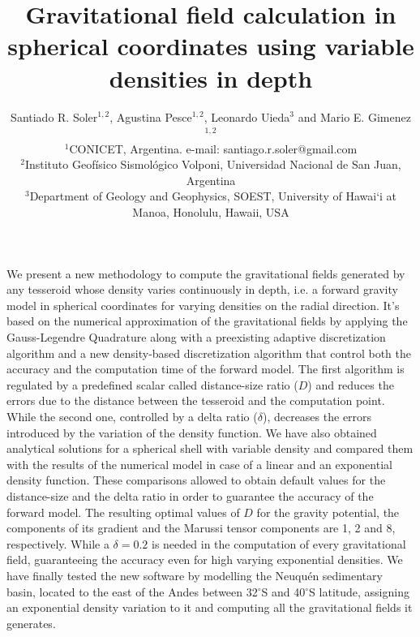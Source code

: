 \documentclass[extra]{gji}
\begin{document}
\title[Variable Density Tesseroids]{
    Gravitational field calculation in spherical coordinates using variable 
    densities in depth
}
\author[S.R. Soler, A. Pesce, L. Uieda and M.E. Gimenez]{
    Santiado R. Soler$^{1,2}$, Agustina Pesce$^{1,2}$, Leonardo Uieda$^3$ and
    Mario E. Gimenez$^{1,2}$ \\
    $^1$CONICET, Argentina. e-mail: santiago.r.soler@gmail.com\\
    $^2$Instituto Geofísico Sismológico Volponi, Universidad Nacional de
    San Juan, Argentina\\
    $^3$Department of Geology and Geophysics, SOEST, University of Hawai‘i at
    Manoa, Honolulu, Hawaii, USA
    }


\maketitle

\begin{summary}
We present a new methodology to compute the gravitational fields generated by 
any tesseroid whose density varies continuously in depth, i.e. a forward 
gravity model in spherical coordinates for varying densities on the radial 
direction.
It's based on the numerical approximation of the gravitational fields by 
applying the Gauss-Legendre Quadrature along with a preexisting adaptive 
discretization algorithm and a new density-based discretization algorithm that 
control both the accuracy and the computation time of the forward model.
The first algorithm is regulated by a predefined scalar called distance-size 
ratio ($D$) and reduces the errors due to the distance between the tesseroid 
and the computation point.
While the second one, controlled by a delta ratio ($\delta$), decreases the 
errors introduced by the variation of the density function.
We have also obtained analytical solutions for a spherical shell with variable 
density and compared them with the results of the numerical model in case of a 
linear and an exponential density function.
These comparisons allowed to obtain default values for the distance-size and 
the delta ratio in order to guarantee the accuracy of the forward model.
The resulting optimal values of $D$ for the gravity potential, the components 
of its gradient and the Marussi tensor components are 1, 2 and 8, 
respectively.
While a $\delta=0.2$ is needed in the computation of every gravitational 
field, guaranteeing the accuracy even for high varying exponential densities.
We have finally tested the new software by modelling the Neuqu\'en sedimentary 
basin, located to the east of the Andes between 32$^\circ$S and 40$^\circ$S 
latitude, assigning an exponential density variation to it and computing all 
the gravitational fields it generates.
\end{summary}
\end{document}
